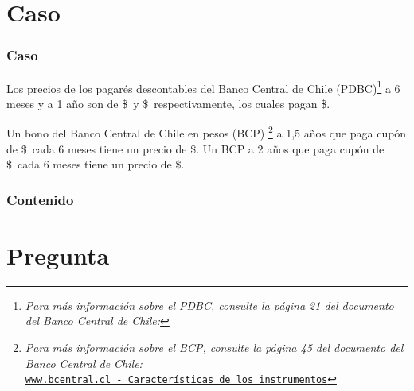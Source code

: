 \documentclass{beamer}
\begin{document}
\section{Caso}
  \begin{frame}
    
  \frametitle{Caso}

  Los precios de los pagarés descontables del Banco Central de Chile (PDBC)\footnote{\textit{Para 
  más información sobre el PDBC, consulte la página 21 del documento del Banco Central de Chile:}}
  a 6 meses y a 1 año son de \$\Fseis\ y \$\Funo\, respectivamente, los cuales pagan \$\Nominal.
  \vspace{0.5em}
  
  
  Un bono del Banco Central de Chile en pesos (BCP) \footnote{\textit{Para más información sobre el BCP, 
  consulte la página 45 del documento del Banco Central de Chile:}\\
  \tiny{\href{https://www.bcentral.cl/contenido/-/detalle/caracteristicas-de-los-instrumentos-del-mercado-financiero-nacional-3}
  {\texttt{www.bcentral.cl - Características de los instrumentos}}}}
  a 1,5 años que paga cupón de  \$\CunoCinco\  cada 6 meses tiene un precio de \$\PunoCinco. 
  Un BCP a 2 años que paga
  cupón de \$\Cdos\ cada 6 meses tiene un precio de \$\Pdos.

  \end{frame}
\begin{frame}
    \frametitle{Contenido}
    \tableofcontents
\end{frame}


\section{Pregunta }
\end{document}
